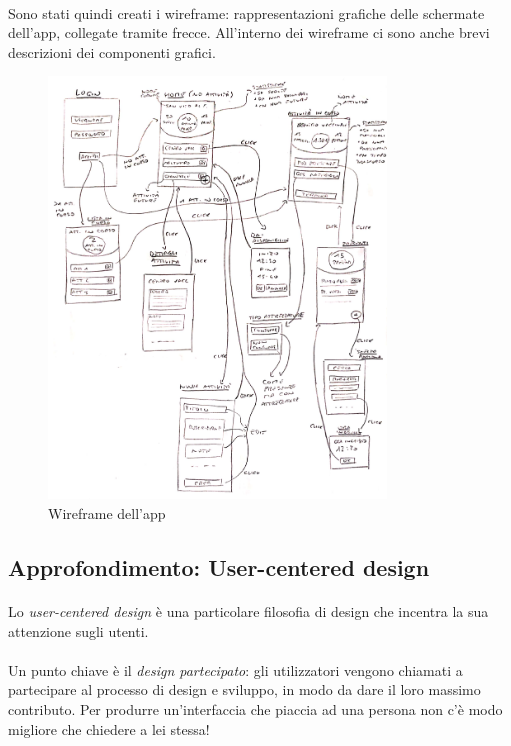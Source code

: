 \documentclass[12pt,a4paper,twoside,english,italian]{book}
\begin{document}
\paragraph{} Sono stati quindi creati i wireframe: rappresentazioni grafiche delle schermate dell'app, collegate tramite frecce. All'interno dei wireframe ci sono anche brevi descrizioni dei componenti grafici.

\begin{figure}[H]
    \centering
    \includegraphics[width=0.8\textwidth]{img/wireframe app.pdf}
    \caption{Wireframe dell'app}
\end{figure}



\subsection{Approfondimento: User-centered design}

\paragraph{} Lo \emph{user-centered design} \cite{ucd} è una particolare filosofia di design che incentra la sua attenzione sugli utenti.

\paragraph{} Un punto chiave è il \emph{design partecipato}: gli utilizzatori vengono chiamati a partecipare al processo di design e sviluppo, in modo da dare il loro massimo contributo. Per produrre un'interfaccia che piaccia ad una persona non c'è modo migliore che chiedere a lei stessa!
\end{document}
